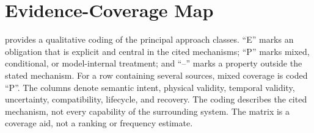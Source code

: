 \section{Evidence-Coverage Map}
\label{app:evidence-map}

 provides a qualitative coding of the principal approach
classes.  ``E'' marks an obligation that is explicit and central in the cited
mechanisms; ``P'' marks mixed, conditional, or model-internal treatment; and
``--'' marks a property outside the stated mechanism.  For a row containing
several sources, mixed coverage is coded ``P''.  The columns denote semantic
intent, physical validity, temporal validity, uncertainty, compatibility,
lifecycle, and recovery.  The coding describes the cited mechanism, not every
capability of the surrounding system.  The matrix is a coverage aid, not a
ranking or frequency estimate.


